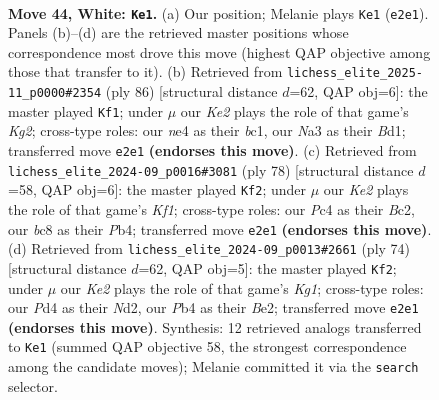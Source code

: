 \documentclass[11pt]{article}
\begin{document}
\clearpage

\begin{figure}[p]\centering
\begin{subfigure}{0.46\textwidth}\centering
\resizebox{\linewidth}{!}{%
\newchessgame
\chessboard[
  setfen={1rb5/p2p2k1/1pp5/5p1p/1PPPnP2/NB6/P3K2P/2R5 w - - 5 44},
  showmover=false,
  pgfstyle=straightmove, color=movearrow, markmove={e2-e1}
]}
\caption{}
\end{subfigure}\hfill
\begin{subfigure}{0.46\textwidth}\centering
\resizebox{\linewidth}{!}{%
\newchessgame
\chessboard[
  setfen={8/1n4k1/1P1p2p1/3Np2p/4P2P/p2p1PP1/P5K1/2bB4 w - - 2 44},
  showmover=false,
  pgfstyle=straightmove, color=movearrow, markmove={g2-f1}
]}
\caption{}
\end{subfigure}
\\[4pt]
\begin{subfigure}{0.46\textwidth}\centering
\resizebox{\linewidth}{!}{%
\newchessgame
\chessboard[
  setfen={8/6kp/1n1p4/1p1Pp3/1Pp1P1Nn/2P1P2P/2B5/5K2 w - - 0 40},
  showmover=false,
  pgfstyle=straightmove, color=movearrow, markmove={f1-f2}
]}
\caption{}
\end{subfigure}\hfill
\begin{subfigure}{0.46\textwidth}\centering
\resizebox{\linewidth}{!}{%
\newchessgame
\chessboard[
  setfen={b7/4k2p/p2pp1p1/1p2n3/4P3/P1P4P/2PNB1P1/6K1 w - - 2 38},
  showmover=false,
  pgfstyle=straightmove, color=movearrow, markmove={g1-f2}
]}
\caption{}
\end{subfigure}
\caption{\textbf{Move 44, White: \texttt{Ke1}.} (a) Our position; Melanie plays \texttt{Ke1} (\texttt{e2e1}). Panels (b)--(d) are the retrieved master positions whose correspondence most drove this move (highest QAP objective among those that transfer to it). (b) Retrieved from \texttt{lichess\_elite\_2025-11\_p0000\#2354} (ply 86) [structural distance $d$=62, QAP obj=6]: the master played \texttt{Kf1}; under $\mu$ our \emph{Ke2} plays the role of that game's \emph{Kg2}; cross-type roles: our \emph{n}e4 as their \emph{b}c1, our \emph{N}a3 as their \emph{B}d1; transferred move \texttt{e2e1} \textbf{(endorses this move)}. (c) Retrieved from \texttt{lichess\_elite\_2024-09\_p0016\#3081} (ply 78) [structural distance $d$=58, QAP obj=6]: the master played \texttt{Kf2}; under $\mu$ our \emph{Ke2} plays the role of that game's \emph{Kf1}; cross-type roles: our \emph{P}c4 as their \emph{B}c2, our \emph{b}c8 as their \emph{P}b4; transferred move \texttt{e2e1} \textbf{(endorses this move)}. (d) Retrieved from \texttt{lichess\_elite\_2024-09\_p0013\#2661} (ply 74) [structural distance $d$=62, QAP obj=5]: the master played \texttt{Kf2}; under $\mu$ our \emph{Ke2} plays the role of that game's \emph{Kg1}; cross-type roles: our \emph{P}d4 as their \emph{N}d2, our \emph{P}b4 as their \emph{B}e2; transferred move \texttt{e2e1} \textbf{(endorses this move)}. Synthesis: 12 retrieved analogs transferred to \texttt{Ke1} (summed QAP objective 58, the strongest correspondence among the candidate moves); Melanie committed it via the \texttt{search} selector.}
\label{fig:thought-m86}
\end{figure}
\end{document}
